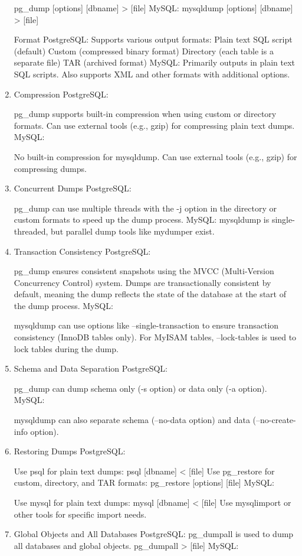 \documentclass[sigconf,natbib=false]{acmart}
\begin{document}
\begin{draft}
\begin{enumerate}
    pg_dump [options] [dbname] > [file]
    MySQL:
    mysqldump [options] [dbname] > [file]

 \itemOutput Format PostgreSQL:
    Supports various output formats:
    Plain text SQL script (default)
    Custom (compressed binary format)
    Directory (each table is a separate file)
    TAR (archived format)
    MySQL:
    Primarily outputs in plain text SQL scripts.
    Also supports XML and other formats with additional options.
 \item Compression PostgreSQL:

    pg_dump supports built-in compression when using custom or directory formats.
    Can use external tools (e.g., gzip) for compressing plain text dumps.
MySQL:

No built-in compression for mysqldump.
Can use external tools (e.g., gzip) for compressing dumps.
 \item Concurrent Dumps PostgreSQL:

pg_dump can use multiple threads with the -j option in the directory or custom formats to speed up the dump process.
MySQL:
mysqldump is single-threaded, but parallel dump tools like mydumper exist.
 \item Transaction Consistency PostgreSQL:

pg_dump ensures consistent snapshots using the MVCC (Multi-Version Concurrency Control) system.
Dumps are transactionally consistent by default, meaning the dump reflects the state of the database at the start of the dump process.
MySQL:

mysqldump can use options like --single-transaction to ensure transaction consistency (InnoDB tables only).
For MyISAM tables, --lock-tables is used to lock tables during the dump.
 \item Schema and Data Separation PostgreSQL:

    pg_dump can dump schema only (-s option) or data only (-a option).
    MySQL:

mysqldump can also separate schema (--no-data option) and data (--no-create-info option).
 \item Restoring Dumps PostgreSQL:

    Use psql for plain text dumps: psql [dbname] < [file]
    Use pg_restore for custom, directory, and TAR formats: pg_restore [options] [file]
    MySQL:

Use mysql for plain text dumps: mysql [dbname] < [file]
Use mysqlimport or other tools for specific import needs.
 \item Global Objects and All Databases PostgreSQL:
    pg_dumpall is used to dump all databases and global objects.
    pg_dumpall > [file]
    MySQL:
    

\end{enumerate}
\end{draft}
\end{document}
